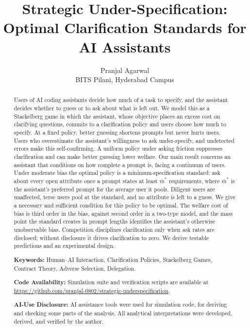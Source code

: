 \documentclass[11pt]{article}
\title{Strategic Under-Specification: Optimal Clarification Standards for AI Assistants}
\author{Pranjal Agarwal \\ \small BITS Pilani, Hyderabad Campus}
\date{}
\begin{document}
\maketitle

\begin{abstract}
Users of AI coding assistants decide how much of a task to specify, and the assistant decides whether to guess or to ask about what is left out. We model this as a Stackelberg game in which the assistant, whose objective places an excess cost on clarifying questions, commits to a clarification policy and users choose how much to specify. At a fixed policy, better guessing shortens prompts but never hurts users. Users who overestimate the assistant's willingness to ask under-specify, and undetected errors make this self-confirming. A uniform policy under asking friction suppresses clarification and can make better guessing lower welfare. Our main result concerns an assistant that conditions on how complete a prompt is, facing a continuum of users. Under moderate bias the optimal policy is a minimum-specification standard: ask about every open attribute once a prompt states at least $\bar m^*$ requirements, where $\bar m^*$ is the assistant's preferred prompt for the average user it pools. Diligent users are unaffected, terse users pool at the standard, and no attribute is left to a guess. We give a necessary and sufficient condition for this policy to be optimal. The welfare cost of bias is third order in the bias, against second order in a two-type model, and the mass point the standard creates in prompt lengths identifies the assistant's otherwise unobservable bias. Competition disciplines clarification only when ask rates are disclosed; without disclosure it drives clarification to zero. We derive testable predictions and an experimental design.

\vspace{0.75em}
\noindent\textbf{Keywords:} Human--AI Interaction, Clarification Policies, Stackelberg Games, Contract Theory, Adverse Selection, Delegation.

\vspace{0.25em}
\noindent\textbf{Code Availability:} Simulation suite and verification scripts are available at \url{https://github.com/pranjal-0802/strategic-underspecification}.

\vspace{0.25em}
\noindent\textbf{AI-Use Disclosure:} AI assistance tools were used for simulation code, for deriving and checking some parts of the analysis. All analytical interpretations were developed, derived, and verified by the author.
\end{abstract}
\end{document}
